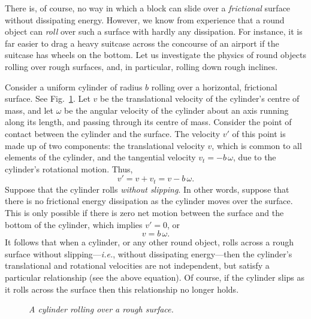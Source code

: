 There is, of course, no way in which a block can  slide over a {\em frictional}
surface without dissipating energy. However, we know from experience that
a round object can {\em roll} over such a  surface with hardly
any  dissipation. For instance, it is far easier to drag a heavy suitcase across the
concourse of an airport
if the suitcase has wheels on the bottom. Let us investigate the physics of round objects rolling
over rough surfaces, and, in particular, rolling
down rough inclines.

Consider a uniform cylinder of radius $b$ rolling over a horizontal, frictional surface.
See Fig.~\ref{f84}. Let $v$ be the translational velocity of the cylinder's centre of
mass, and let $\omega$ be the angular velocity of the cylinder about an axis running along
its length, and passing through its centre of mass. Consider the point
of contact between the cylinder and the surface. The velocity $v'$ of this point
is made up of two components: the translational velocity $v$, which is common to all
elements of the cylinder, and the tangential velocity $v_t=-b\,\omega$, due to the
cylinder's rotational motion. Thus,
\begin{equation}
v' = v + v_t = v - b\,\omega.
\end{equation}
Suppose that the cylinder rolls {\em without slipping}. In other words, suppose that
there is no frictional energy dissipation as the cylinder moves over the surface.
This is only possible if there is zero net motion between the surface and the 
bottom of the cylinder, which
implies $v'=0$, or
\begin{equation}\label{erolls}
v = b\,\omega.
\end{equation}
It follows that when a cylinder, or any other round object,  rolls across a rough surface without
slipping---{\em i.e.}, without dissipating energy---then the cylinder's translational and
rotational velocities are not independent, but satisfy a particular relationship (see the above equation).
Of course, if the cylinder slips as it rolls across the surface then this relationship
no longer holds.

\begin{figure}
\epsfysize=2in
\centerline{}
\caption{\em A cylinder rolling over a rough surface.}\label{f84}  
\end{figure}

